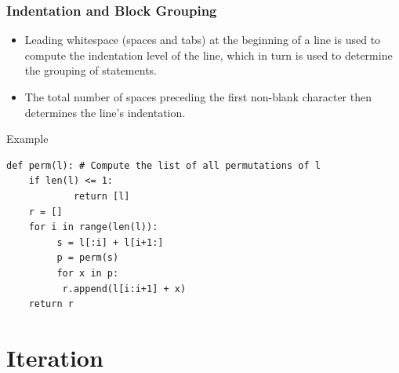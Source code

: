 \documentclass{beamer}
\begin{document}
\begin{frame}[fragile]
\frametitle{Indentation and Block Grouping}
\begin{itemize}
\item Leading whitespace (spaces and tabs) at the beginning of a line is used to compute the \alert{indentation level} of the line, which in turn is used to determine the \alert{grouping of statements}.
\item The total number of spaces preceding the first non-blank character then determines the line's indentation. 
\end{itemize}

\begin{block}{Example}
\tiny
\begin{verbatim}
def perm(l): # Compute the list of all permutations of l
    if len(l) <= 1: 
            return [l]
    r = [] 
    for i in range(len(l)):
         s = l[:i] + l[i+1:]
         p = perm(s) 
         for x in p:
          r.append(l[i:i+1] + x)
    return r
\end{verbatim}
\end{block}
\end{frame}
\section{Iteration}
\end{document}

